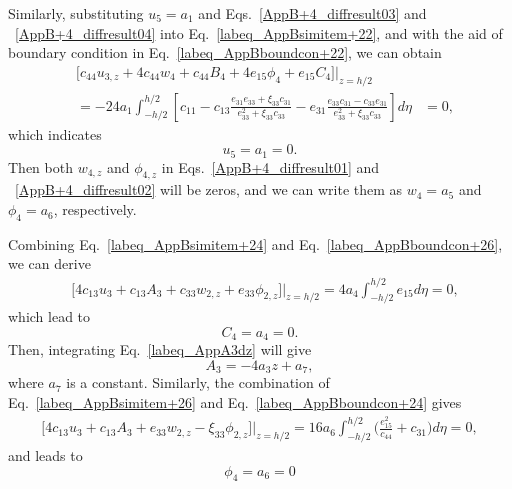 \documentclass[12pt,sort&compress,fleqn,3p]{elsarticle}
\newcommand{\er}[4]{{#1}_{#2}{#3}_{#4}}
\newcommand{\de}[5]{{#1}_{#2}{#3}_{{#4},{#5}}}
\begin{document}
Similarly, substituting $u_5 = a_1$  and Eqs.~\eqref{AppB+4_diffresult03} and ~\eqref{AppB+4_diffresult04} into Eq.~\eqref{labeq_AppBsimitem+22}, and with the aid of boundary condition in Eq.~\eqref{labeq_AppBboundcon+22}, we can obtain
\begin{equation}
\begin{split}
&\big[c_{44}u_{3,z}+4c_{44}w_{4}+c_{44}B_{4}+4e_{15}\phi_{4}+e_{15}C_{4}\big] \big|_{z=h/2}\\
&=-24a_{1}\int_{-h/2}^{h/2}\left[c_{11}-c_{13}\frac{\er{e}{31}{e}{33}+\xi_{33}c_{31}}     {e_{33}^{2}+\xi_{33}c_{33}}-e_{31}\frac{\er{e}{33}{c}{31}-c_{33}e_{31}}{e_{33}^{2}+\xi_{33}c_{33}}\right]d\eta
&=0,
\end{split}
\end{equation}
which indicates
\begin{equation}\label{labeq_AppBa1=0}
u_5= a_1 = 0.
\end{equation}
Then both   $w_{4,z}$ and $\phi_{4,z}$  in  Eqs.~\eqref{AppB+4_diffresult01} and ~\eqref{AppB+4_diffresult02} will be zeros, and we can write them as $w_4 = a_5 $ and $\phi_4 = a_6$, respectively.


Combining  Eq.~\eqref{labeq_AppBsimitem+24}  and  Eq.~\eqref{labeq_AppBboundcon+26}, we can derive
\begin{equation}
\begin{split}
&\big[4c_{13}u_{3}+c_{13}A_{3}+\de{c}{33}{w}{2}{z}+\de{e}{33}{\phi}{2}{z}\big]\Big|_{z=h/2}
=4a_{4}
\int_{-h/2}^{h/2}e_{15}d\eta
=0,
\end{split}
\end{equation}
which lead to
\begin{equation}\label{labeq_AppBa4=0}
C_4= a_4 = 0.
\end{equation}
Then,  integrating   Eq.~\eqref{labeq_AppA3dz} will give
\begin{equation}\label{labeq_AppA3}
A_{3}=-4a_{3}z+a_{7},
\end{equation}
where $a_7$ is a constant. Similarly, the combination of Eq.~\eqref{labeq_AppBsimitem+26}  and  Eq.~\eqref{labeq_AppBboundcon+24} gives
\begin{equation}
\begin{split}
\big[4c_{13}u_{3}+c_{13}A_{3}+\de{e}{33}{w}{2}{z}-\de{\xi}{33}{\phi}{2}{z}\big]\Big|_{z=h/2}=16a_{6}
\int_{-h/2}^{h/2}\Big(\frac{e_{15}^{2}}{c_{44}}+c_{31}\Big)d\eta=0,
\end{split}
\end{equation}
and leads to
\begin{equation}\label{labeq_AppBa6=0}
\phi_{4}=a_{6}=0
\end{equation}
\end{document}
